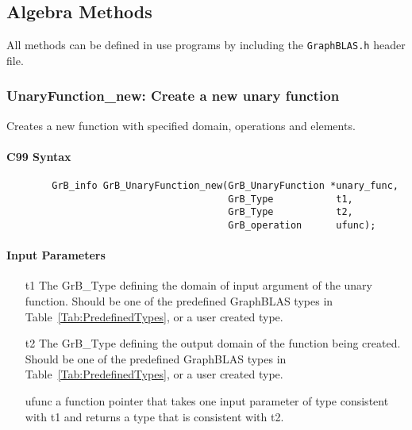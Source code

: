 \subsection{Algebra Methods}

All methods can be defined in use programs by including the {\tt GraphBLAS.h} header file.


\subsubsection{{\sf UnaryFunction\_new}: Create a new unary function}

Creates a new function with specified domain, operations and elements.

\paragraph{C99 Syntax}

\begin{verbatim}
        GrB_info GrB_UnaryFunction_new(GrB_UnaryFunction *unary_func,
                                       GrB_Type           t1,
                                       GrB_Type           t2,
                                       GrB_operation      ufunc);
\end{verbatim}

\paragraph{Input Parameters}

\begin{itemize}[leftmargin=1.1in]
    \item[{\sf t1}] The {\sf GrB\_Type} defining the domain of input argument of
    the unary function. Should be one of the predefined
    GraphBLAS types in Table~\ref{Tab:PredefinedTypes}, or a user created type.
    \item[{\sf t2}] The {\sf GrB\_Type} defining the output domain of the function
    being created.  Should be one of the predefined
    GraphBLAS types in Table~\ref{Tab:PredefinedTypes}, or a user created type.
    \item[{\sf ufunc}] a function pointer that takes one input parameter of type consistent
    with t1 and returns a type that is consistent with t2.
\end{itemize}

